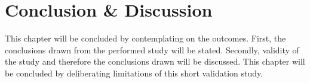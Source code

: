 
%



\section{Conclusion \& Discussion}
This chapter will be concluded by contemplating on the outcomes. First, the conclusions drawn from the performed study will be stated. Secondly, validity of the study and therefore the conclusions drawn will be discussed. This chapter will be concluded by deliberating limitations of this short validation study.
